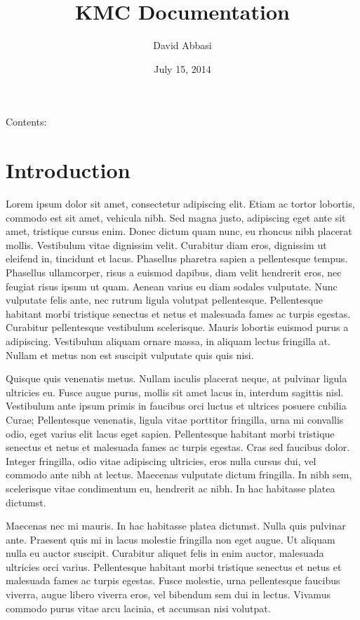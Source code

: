 \documentclass[letterpaper,10pt,english]{sphinxmanual}
\title{KMC Documentation}
\date{July 15, 2014}
\author{David Abbasi}
\begin{document}
\maketitle
\tableofcontents
{}\label{index::doc}


Contents:


\chapter{Introduction}
\label{intro:introduction}\label{intro:welcome-to-kmc-s-documentation}\label{intro::doc}
Lorem ipsum dolor sit amet, consectetur adipiscing elit. Etiam ac tortor
lobortis, commodo est sit amet, vehicula nibh. Sed magna justo, adipiscing eget
ante sit amet, tristique cursus enim. Donec dictum quam nunc, eu rhoncus nibh
placerat mollis. Vestibulum vitae dignissim velit. Curabitur diam eros,
dignissim ut eleifend in, tincidunt et lacus. Phasellus pharetra sapien a
pellentesque tempus. Phasellus ullamcorper, risus a euismod dapibus, diam velit
hendrerit eros, nec feugiat risus ipsum ut quam. Aenean varius eu diam sodales
vulputate. Nunc vulputate felis ante, nec rutrum ligula volutpat pellentesque.
Pellentesque habitant morbi tristique senectus et netus et malesuada fames ac
turpis egestas. Curabitur pellentesque vestibulum scelerisque. Mauris lobortis
euismod purus a adipiscing. Vestibulum aliquam ornare massa, in aliquam lectus
fringilla at. Nullam et metus non est suscipit vulputate quis quis nisi.

Quisque quis venenatis metus. Nullam iaculis placerat neque, at pulvinar ligula
ultricies eu. Fusce augue purus, mollis sit amet lacus in, interdum sagittis
nisl. Vestibulum ante ipsum primis in faucibus orci luctus et ultrices posuere
cubilia Curae; Pellentesque venenatis, ligula vitae porttitor fringilla, urna
mi convallis odio, eget varius elit lacus eget sapien. Pellentesque habitant
morbi tristique senectus et netus et malesuada fames ac turpis egestas. Cras
sed faucibus dolor. Integer fringilla, odio vitae adipiscing ultricies, eros
nulla cursus dui, vel commodo ante nibh at lectus. Maecenas vulputate dictum
fringilla. In nibh sem, scelerisque vitae condimentum eu, hendrerit ac nibh. In
hac habitasse platea dictumst.

Maecenas nec mi mauris. In hac habitasse platea dictumst. Nulla quis pulvinar
ante. Praesent quis mi in lacus molestie fringilla non eget augue. Ut aliquam
nulla eu auctor suscipit. Curabitur aliquet felis in enim auctor, malesuada
ultricies orci varius. Pellentesque habitant morbi tristique senectus et netus
et malesuada fames ac turpis egestas. Fusce molestie, urna pellentesque
faucibus viverra, augue libero viverra eros, vel bibendum sem dui in lectus.
Vivamus commodo purus vitae arcu lacinia, et accumsan nisi volutpat.
\end{document}
